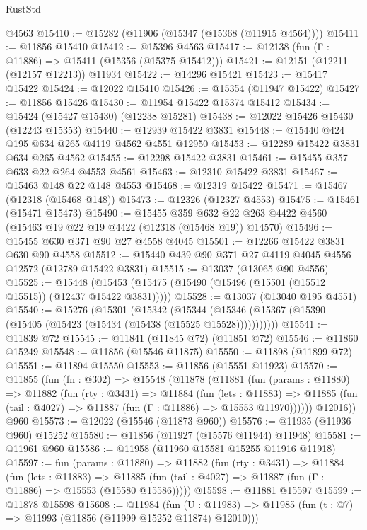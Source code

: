 \begin{lexlean}{RustStd}
\begin{coremodule}
    @4563
@15410 := @15282 (@11906 (@15347 (@15368 (@11915 @4564))))
@15411 := @11856 @15410
@15412 := @15396 @4563
@15417 := @12138 (fun (Γ : @11886) => @15411 (@15356 (@15375 @15412)))
@15421 := @12151 (@12211 (@12157 @12213)) @11934
@15422 := @14296 @15421
@15423 := @15417 @15422
@15424 := @12022 @15410
@15426 := @15354 (@11947 @15422)
@15427 := @11856 @15426
@15430 := @11954 @15422 @15374 @15412
@15434 := @15424 (@15427 @15430) (@12238 @15281)
@15438 := @12022 @15426 @15430 (@12243 @15353)
@15440 := @12939 @15422 @3831
@15448 := @15440 @424 @195 @634 @265 @4119 @4562 @4551 @12950
@15453 := @12289 @15422 @3831 @634 @265 @4562
@15455 := @12298 @15422 @3831
@15461 := @15455 @357 @633 @22 @264 @4553 @4561
@15463 := @12310 @15422 @3831
@15467 := @15463 @148 @22 @148 @4553
@15468 := @12319 @15422
@15471 := @15467 (@12318 (@15468 @148))
@15473 := @12326 (@12327 @4553)
@15475 := @15461 (@15471 @15473)
@15490 := @15455
    @359
    @632
    @22
    @263
    @4422
    @4560
    (@15463 @19 @22 @19 @4422 (@12318 (@15468 @19)) @14570)
@15496 := @15455 @630 @371 @90 @27 @4558 @4045
@15501 := @12266 @15422 @3831 @630 @90 @4558
@15512 := @15440 @439 @90 @371 @27 @4119 @4045 @4556 @12572 (@12789 @15422 @3831)
@15515 := @13037 (@13065 @90 @4556)
@15525 := @15448 (@15453 (@15475 (@15490 (@15496 (@15501 (@15512 @15515)) (@12437 @15422 @3831)))))
@15528 := @13037 (@13040 @195 @4551)
@15540 := @15276
    (@15301
      (@15342
        (@15344 (@15346 (@15367 (@15390 (@15405 (@15423 (@15434 (@15438 (@15525 @15528)))))))))))
@15541 := @11839 @72
@15545 := @11841 (@11845 @72) (@11851 @72)
@15546 := @11860 @15249
@15548 := @11856 (@15546 @11875)
@15550 := @11898 (@11899 @72)
@15551 := @11894 @15550
@15553 := @11856 (@15551 @11923)
@15570 := @11855
    (fun (fn : @302) =>
    @15548
      (@11878
        (@11881
          (fun (params : @11880) =>
          @11882
            (fun (rty : @3431) =>
            @11884
              (fun (lets : @11883) =>
              @11885 (fun (tail : @4027) => @11887 (fun (Γ : @11886) => @15553 @11970))))))
        @12016))
    @960
@15573 := @12022 (@15546 (@11873 @960))
@15576 := @11935 (@11936 @960) @15252
@15580 := @11856 (@11927 (@15576 @11944) @11948)
@15581 := @11961 @960
@15586 := @11958 (@11960 @15581 @15255 @11916 @11918)
@15597 := fun (params : @11880) =>
  @11882
    (fun (rty : @3431) =>
    @11884
      (fun (lets : @11883) =>
      @11885 (fun (tail : @4027) => @11887 (fun (Γ : @11886) => @15553 (@15580 @15586)))))
@15598 := @11881 @15597
@15599 := @11878 @15598
@15608 := @11984
    (fun (U : @11983) => @11985 (fun (t : @7) => @11993 (@11856 (@11999 @15252 @11874) @12010)))

\end{coremodule}
\end{lexlean}
